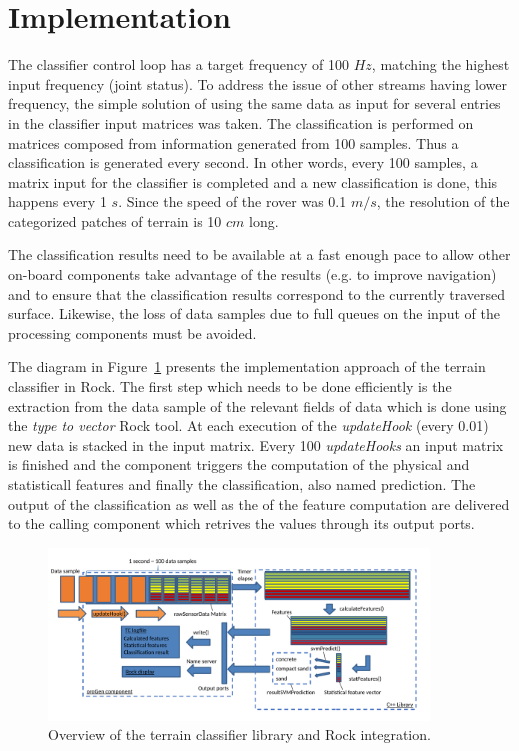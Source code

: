 
\section{Implementation}

The classifier control loop has a target frequency of 100 $Hz$, matching the highest input frequency (joint status). 
To address the issue of other streams having lower frequency, the simple solution of using the same data as input for several entries in the classifier input matrices was taken. 
The classification is performed on matrices composed from information generated from 100 samples. 
Thus a classification is generated every second.
In other words, every 100 samples, a matrix input for the classifier is completed and a new classification is done, this happens every 1 $s$.
Since the speed of the rover was 0.1 $m/s$, the resolution of the categorized patches of terrain is 10 $cm$ long.  


The classification results need to be available at a fast enough pace to allow other on-board components take advantage of the results (e.g. to improve navigation) and to ensure that the classification results correspond to the currently traversed surface. 
Likewise, the loss of data samples due to full queues on the input of the processing components must be avoided. 

The diagram in Figure~\ref{fig:overview} presents the implementation approach of the terrain classifier in Rock. 
The first step which needs to be done efficiently is the extraction from the data sample of the relevant fields of data which is done using the \emph{type to vector} Rock tool.
At each execution of the \emph{updateHook} (every 0.01) new data is stacked in the input matrix.
Every 100 \emph{updateHooks} an input matrix is finished and the component triggers the computation of the physical and statisticall features and finally the classification, also named prediction.
The output of the classification as well as the of the feature computation are delivered to the calling component which retrives the values through its output ports. 

\begin{figure}[!htbp]
    \centering
    \includegraphics[width=0.9\textwidth]{../figures/OverviewTC2.pdf}
    \caption{\label{fig:overview}Overview of the terrain classifier library and Rock integration.}
\end{figure}

